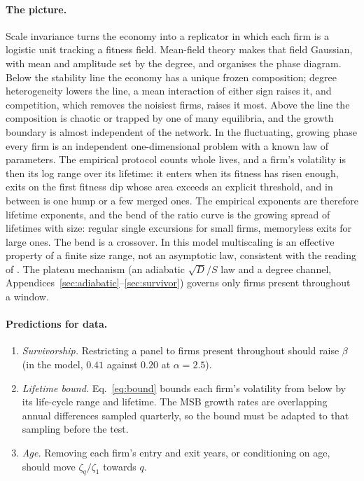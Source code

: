 \documentclass[11pt]{article}
\begin{document}
\paragraph{The picture.}
Scale invariance turns the economy into a replicator in which each firm is a logistic unit
tracking a fitness field.  Mean-field theory makes that field Gaussian, with mean and amplitude
set by the degree, and organises the phase diagram.  Below the stability line the economy has a
unique frozen composition; degree heterogeneity lowers the line, a mean interaction of either
sign raises it, and competition, which removes the noisiest firms, raises it most.  Above the
line the composition is chaotic or trapped by one of many equilibria, and the growth boundary is
almost independent of the network.  In the fluctuating, growing phase every firm is an
independent one-dimensional problem with a known law of parameters.  The empirical protocol counts
whole lives, and a firm's volatility is then its log range over its lifetime: it enters when its
fitness has risen enough, exits on the first fitness dip whose area exceeds an explicit threshold,
and in between is one hump or a few merged ones.  The empirical exponents are therefore lifetime
exponents, and the bend of the ratio curve is the growing spread of lifetimes with size: regular
single excursions for small firms, memoryless exits for large ones.  The bend is a crossover.  In
this model multiscaling is an effective property of a finite size range, not an asymptotic law,
consistent with the reading of \citet{moran2024}.  The plateau mechanism (an adiabatic
$\sqrt D/S$ law and a degree channel, Appendices~\ref{sec:adiabatic}--\ref{sec:survivor}) governs only
firms present throughout a window.

\paragraph{Predictions for data.}
\begin{enumerate}
  \item \emph{Survivorship.}  Restricting a panel to firms present throughout should raise $\beta$
        (in the model, $0.41$ against $0.20$ at $\alpha=2.5$).
  \item \emph{Lifetime bound.}  Eq.~\eqref{eq:bound} bounds each firm's volatility from below by
        its life-cycle range and lifetime.  The MSB growth rates are overlapping annual differences
        sampled quarterly, so the bound must be adapted to that sampling before the test.
  \item \emph{Age.}  Removing each firm's entry and exit years, or conditioning on age, should move
        $\zeta_q/\zeta_1$ towards $q$.
\end{enumerate}
\end{document}
